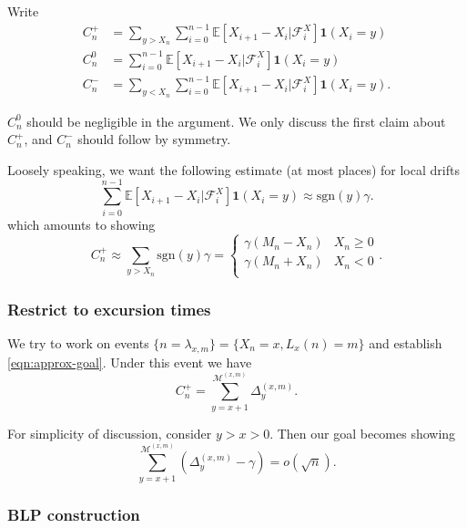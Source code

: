 Write
\begin{align}
	C_n^+ &= \sum_{y > X_n} \sum_{i = 0}^{n-1} \mathbb{E}\left[ X_{i + 1} - X_i | \mathcal{F}_i^X \right] \mathbf{1}(X_i = y)\\
	C_n^0 &= \sum_{i = 0}^{n-1} \mathbb{E}\left[ X_{i + 1} - X_i | \mathcal{F}_i^X \right] \mathbf{1}(X_i = y) \\
	C_n^- &= \sum_{y < X_n} \sum_{i = 0}^{n-1} \mathbb{E}\left[ X_{i + 1} - X_i | \mathcal{F}_i^X \right] \mathbf{1}(X_i = y)
.\end{align}

$C_n^0$ should be negligible in the argument.
We only discuss the first claim about $C_n^+$, and $C_n^-$ should follow by symmetry.


	Loosely speaking, we want the following estimate (at most places) for local drifts
\begin{equation}
	\sum_{i = 0}^{n-1} \mathbb{E}\left[ X_{i + 1} - X_i | \mathcal{F}_i^X \right] \mathbf{1}(X_i = y)
	\approx \text{sgn}(y) \gamma
.\end{equation} 
which amounts to showing
\begin{equation}
	\label{eqn:approx-goal}
	C_n^+ \approx \sum_{y > X_n} \text{sgn}(y)\gamma = \begin{cases}
		\gamma(M_n - X_n) & X_n \ge 0\\
		\gamma(M_n + X_n) & X_n < 0\\
	\end{cases}
.\end{equation}



\subsubsection{Restrict to excursion times}


	We try to work on events $\{n = \lambda_{x, m}\}  = \{X_n = x, L_x(n) = m\} $ and establish \eqref{eqn:approx-goal}. Under this event we have
	\[
		C_n^+ = \sum_{y = x+1}^{\mathcal{M}^{(x,m)}} \Delta_y^{(x,m)}
	.\] 

	For simplicity of discussion, consider $y > x > 0$. Then our goal becomes showing
	\begin{equation}
		\label{eqn:goal-2}
		\sum_{y = x+1}^{\mathcal{M}^{(x,m)}} \left(\Delta_y^{(x,m)} - \gamma\right) = o(\sqrt{n} )
	.\end{equation} 

\subsubsection{BLP construction}


